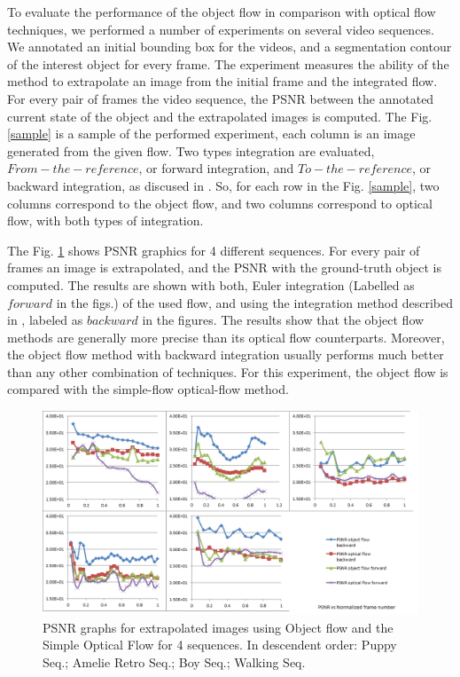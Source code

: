 To evaluate the performance of the object flow in comparison with optical flow techniques, we performed 
a number of experiments on several video sequences. We annotated an initial bounding box for the videos, 
and a segmentation contour of the interest object for every frame. The experiment measures the ability of the method to 
extrapolate an image from the initial frame and the integrated flow. For every pair of frames the video sequence, the PSNR between the annotated
current state of the object and the extrapolated images is computed. The Fig. \ref{sample} is a sample of the performed experiment, each column is an image generated from the given flow. 
Two types integration are evaluated, $From-the-reference$, or forward integration, and $To-the-reference$, or backward integration, as discused in \cite{c20}. So, for each row in the Fig. \ref{sample}, two columns correspond to the object flow, and two columns correspond to optical flow, with both types of integration.

The Fig. \ref{of_res} shows PSNR graphics for 4 different sequences. For every pair of frames an image is extrapolated, and the PSNR with the ground-truth object is computed.
The results are shown with both, Euler integration (Labelled as $forward$ in the figs.) of the used flow, 
and using the integration method described in \cite{c20}, labeled as $backward$ in the figures. The results show that the object flow methods are generally more precise than its optical flow 
counterparts. Moreover, the object flow method with backward integration usually performs much better than any other combination of techniques. For this experiment, the object flow is compared with the simple-flow optical-flow method.

   \begin{figure}[hb]
      \centering
      \includegraphics[width=1.0\textwidth]{../images/psnr.png}
      \caption{PSNR graphs for extrapolated images using Object flow and the Simple Optical Flow for 4 sequences. In descendent order: Puppy Seq.; Amelie Retro Seq.; Boy Seq.; Walking Seq.}
      \label{of_res}
   \end{figure}
	\setlength{\belowcaptionskip}{-10pt}


